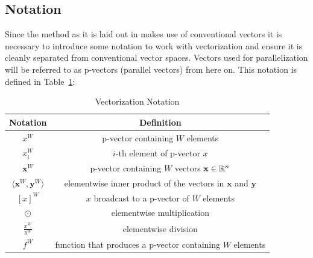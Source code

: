 \documentclass[a4paper, 11pt]{memoir}
\begin{document}
    \subsection{Notation}
    Since the method as it is laid out in \cite{Rhodin:2015} makes use of conventional vectors it is
    necessary to introduce some notation to work with vectorization and ensure it is
    cleanly separated from conventional vector spaces. Vectors used for parallelization
    will be referred to as p-vectors (parallel vectors) from here on. This notation is
    defined in Table~\ref{tab:notation}:
    \begin{table}[H]
        \centering
        \begin{tabular}{|c|c|}
            \hline
            Notation & Definition \\
            \hline
            $x^W$ & p-vector containing $W$ elements\\
            $x^W_i$ & $i$-th element of p-vector $x$\\
            $\mathbf{x}^W$ & p-vector containing $W$ vectors $\mathbf{x} \in \mathbb{R}^n$\\
            $\langle \mathbf{x}^W, \mathbf{y}^W \rangle$ & elementwise inner product of the vectors in $\mathbf{x}$ and $\mathbf{y}$\\
            $[ x ]^W$ & $x$ broadcast to a p-vector of $W$ elements\\
            $\odot$ & elementwise multiplication\\
            $\frac{x^W}{y^W}$ & elementwise division\\
            $f^W$ & function that produces a p-vector containing $W$ elements\\\hline
        \end{tabular}
        \caption{Vectorization Notation}
        \label{tab:notation}
    \end{table}
\end{document}
